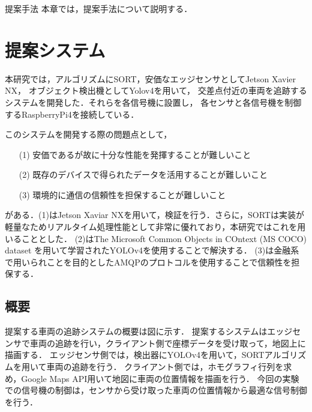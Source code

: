 \chapterhead
{提案手法}
{本章では，提案手法について説明する．}



\section{提案システム}%
本研究では，アルゴリズムにSORT，安価なエッジセンサとしてJetson Xavier NX\cite{jetson}，
オブジェクト検出機としてYolov4\cite{bochkovskiy2020yolov4}を用いて，
交差点付近の車両を追跡するシステムを開発した．それらを各信号機に設置し，
各センサと各信号機を制御するRaspberryPi4を接続している．

このシステムを開発する際の問題点として，

\begin{itemize}
  \item[(1)]安価であるが故に十分な性能を発揮することが難しいこと
  \item[(2)]既存のデバイスで得られたデータを活用することが難しいこと
  \item[(3)]環境的に通信の信頼性を担保することが難しいこと
\end{itemize}
がある．(1)はJetson Xaviar NXを用いて，検証を行う．さらに，SORTは実装が軽量なためリアルタイム処理性能として非常に優れており，本研究ではこれを用いることとした．
(2)はThe Microsoft Common Objects in COntext (MS COCO) dataset\cite{lin2014microsoft}
を用いて学習されたYOLOv4を使用することで解決する．
(3)は金融系で用いられことを目的としたAMQPのプロトコルを使用することで信頼性を担保する．

\subsection{概要}
提案する車両の追跡システムの概要は図に示す．
提案するシステムはエッジセンサで車両の追跡を行い，クライアント側で座標データを受け取って，地図上に描画する．
エッジセンサ側では，検出器にYOLOv4を用いて，SORTアルゴリズム\cite{wojke2017simple}を用いて車両の追跡を行う．
クライアント側では，ホモグラフィ行列を求め，Google Maps API\cite{googlemap}用いて地図に車両の位置情報を描画を行う．
今回の実験での信号機の制御は，センサから受け取った車両の位置情報から最適な信号制御を行う．




\newpage
